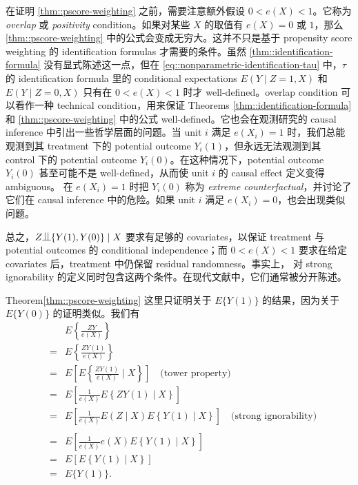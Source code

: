 在证明 \cref{thm::pscore-weighting} 之前，需要注意额外假设 $0<e(X)<1$。它称为 {\it overlap} 或 {\it positivity} condition。如果对某些 $X$ 的取值有 $e(X)=0$ 或 $1$，那么 \cref{thm::pscore-weighting} 中的公式会变成无穷大。这并不只是基于 propensity score weighting 的 identification formulas 才需要的条件。虽然 \cref{thm::identification-formula} 没有显式陈述这一点，但在 \eqref{eq::nonparametric-identification-tau} 中，$\tau$ 的 identification formula 里的 conditional expectations $E(Y\mid Z=1, X)$ 和 $ E(Y\mid Z=0, X)$ 只有在 $0< e(X) < 1$ 时才 well-defined。overlap condition 可以看作一种 technical condition，用来保证 Theorems \cref{thm::identification-formula} 和 \cref{thm::pscore-weighting} 中的公式 well-defined。它也会在观测研究的 causal inference 中引出一些哲学层面的问题。当 unit $i$ 满足 $e(X_i)=1$ 时，我们总能观测到其 treatment 下的 potential outcome $Y_i(1)$，但永远无法观测到其 control 下的 potential outcome $Y_i(0)$。在这种情况下，potential outcome $Y_i(0)$ 甚至可能不是 well-defined，从而使 unit $i$ 的 causal effect 定义变得 ambiguous。\citet{king2006dangers} 在 $e(X_i)=1$ 时把 $Y_i(0)$ 称为 {\it extreme counterfactual}，并讨论了它们在 causal inference 中的危险。如果 unit $i$ 满足 $e(X_i)=0$，也会出现类似问题。
 
 
总之，$Z\ind \{ Y(1), Y(0)  \} \mid X$ 要求有足够的 covariates，以保证 treatment 与 potential outcomes 的 conditional independence；而 $0<e(X)<1$ 要求在给定 covariates 后，treatment 中仍保留 residual randomness。事实上，\citet{rosenbaum1983central} 对 strong ignorability 的定义同时包含这两个条件。在现代文献中，它们通常被分开陈述。
 


 

\begin{myproof}{Theorem}{\cref{thm::pscore-weighting}}
这里只证明关于 $E\{ Y(1) \}$ 的结果，因为关于 $E\{ Y(0) \}$ 的证明类似。我们有
\begin{eqnarray*}
&&E\left\{  \frac{ZY}{e(X)}  \right\} \\
&=& E\left\{  \frac{ZY(1)}{e(X)}  \right\} \\
&=& E\left[ E\left\{  \frac{ZY(1)}{e(X)}  \mid X \right\}  \right]  \quad \text{(tower property)} \\
&=& E\left[  \frac{1}{e(X)}   E\left\{   ZY(1)  \mid X \right\}  \right]   \\
&=& E\left[  \frac{1}{e(X)}   E( Z  \mid X ) E\left\{   Y(1)  \mid X \right\}  \right]  \quad \text{(strong ignorability)} \\\\
&=& E\left[  \frac{1}{e(X)}   e(X) E\left\{   Y(1)  \mid X \right\}  \right] \\
&=& E\left[ E\left\{   Y(1)  \mid X \right\}  \right] \\
&=& E\{   Y(1) \}. 
\end{eqnarray*}
\end{myproof}



